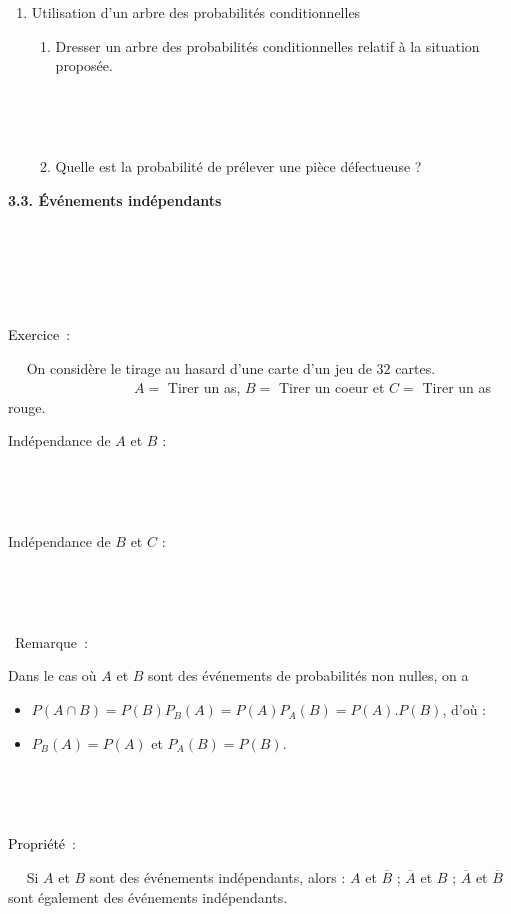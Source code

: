 \documentclass[11pt,a4paper]{article}
\newcounter{numexos}%
\newcommand{\exercice}[1]{%
\addtocounter{numexos}{1}%
\textcolor{black}{\normalsize Exercice\,\thenumexos\,}\,#1%
}
\newcounter{nump}%
\newcommand{\propriete}[1]{%
\addtocounter{nump}{1}%
\textcolor{black}{Propriété\,\thenump\,}\,#1%
}
\newcommand{\bex}[2]
{\begin{bclogo}[couleur = white,logo= , barre=none,  arrondi = 0.1]
{~\exercice:~~{#1}}
~~
{#2}
~~
\end{bclogo}}
\newcommand{\rem}[1]
{\begin{bclogo}[couleur = white,logo=\bcinfo , arrondi = 0.1]
{~Remarque~:}
~~
{#1}
~~
\end{bclogo}}
\newcommand{\bprop}[2]
{\begin{bclogo}[couleur =white ,logo= , barre=none,  arrondi = 0.1]
{~\propriete:~~{#1}}
~~
{#2}
~~
\end{bclogo}}
\newcommand{\cadre}[1]
{\begin{bclogo}[couleur = white,logo=,  arrondi = 0.1,barre=none]
~~
{%
\rule{0mm}{#1mm}}\par
\medskip
~~
\end{bclogo}}
\begin{document}
\begin{enumerate}
\begin{enumerate}
         \item Quelle est la probabilité de prélever une pièce défectueuse ?

         \dotfill 
      \end{enumerate}
      \item Utilisation d'un arbre des probabilités conditionnelles
      \begin{enumerate}
         \item Dresser un arbre des probabilités conditionnelles relatif à la situation proposée.
         \begin{center}
             \begin{minipage}{7cm}
                 \cadre{40}
             \end{minipage}
         \end{center}
         \item Quelle est la probabilité de prélever une pièce défectueuse ?
          \vspace{1mm}
          
         \dotfill
      \end{enumerate}
   \end{enumerate}





\newpage

\begin{mybox}
\begin{center}    
\textbf{3.3. Événements indépendants}
\end{center}
\end{mybox}


\cadre{30}
\bex{}{
   On considère le tirage au hasard d'une carte d'un jeu de $32$ cartes.\\
   
   ~~~~~~~~~~~~~~~~~~$A=$ Tirer un as, \hfill $B=$ Tirer un coeur \hfill et  \hfill $C=$ Tirer un as rouge.~~~~~~~~~~~~~~~~~~
      }
   \vspace{3mm}
   Indépendance de $A$ et $B$ :
\cadre{25}   
 \vspace{3mm}
   Indépendance de $B$ et $C$ :
   
\cadre{25}




\smallskip

\rem{
   Dans le cas où $A$ et $B$ sont des événements de probabilités non nulles, on a 
   \begin{itemize}
      \item $P(A\cap B)=P(B)P_B(A)=P(A)P_A(B)=P(A).P(B)$, d'où :
      \item $P_B(A)=P(A)$ et $P_A(B)=P(B)$.
   \end{itemize}
}
\bprop{}{
   Si $A$ et $B$ sont des événements indépendants, alors : $A$ et $\overline{B}$ ; $\overline{A}$ et $B$ ; $\overline{A}$ et $\overline{B}$ sont également des événements indépendants.}
\end{document}
